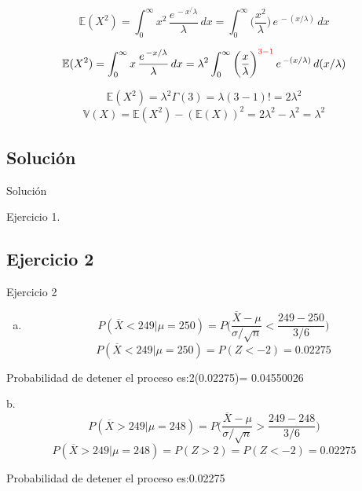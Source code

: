 \documentclass[
  ignorenonframetext,
]{beamer}
\begin{document}
\hypertarget{section}{%
\subsection{}\label{section}}

\begin{frame}{}

\[\mathbb{E}(X^2)  = \displaystyle\int_{0}^{\infty}x^2\, \frac{\displaystyle e^{\,-x^/\lambda} }{\lambda}\,dx  = \displaystyle\int_{0}^{\infty} \bigg(\frac{x^2}{\lambda}\bigg) \, \displaystyle e^{\,-(x /\lambda)} \,dx\]

\[\mathbb{E}(X^2)  = \displaystyle\int_{0}^{\infty}x\, \frac{\displaystyle e^{\,-x/\lambda} }{\lambda}\,dx =\lambda^2\displaystyle\int_{0}^{\infty} \bigg(\frac{x}{\lambda}\bigg)^{\color{red}3-1 } \, \displaystyle e^{\,-(x /\lambda)} \,d(x/\lambda)\]

\[\mathbb{E}(X^2)  =\lambda^2\Gamma(3)=\lambda(3-1)!=2\lambda^2 \]
\[\mathbb{V}(X)=\mathbb{E}(X^2)-(\mathbb{E}(X))^2 =2\lambda^2- \lambda^2=\lambda^2\]

\end{frame}

\hypertarget{soluciuxf3n}{%
\subsection{Solución}\label{soluciuxf3n}}

\begin{frame}{Solución}

Ejercicio 1.

\end{frame}

\hypertarget{ejercicio-2-1}{%
\subsection{Ejercicio 2}\label{ejercicio-2-1}}

\begin{frame}{Ejercicio 2}

\begin{enumerate}
[a.]
\item
  \justifying

  \[P(\overline{X}<249|\mu=250)=P\Bigg(\frac{\overline{X}-\mu}{\sigma/\sqrt{n}} <\frac{ 249-250}{3/6}\Bigg) \]
  \[P(\overline{X}<249|\mu=250)=P(Z<-2)=0.02275\]
\end{enumerate}

Probabilidad de detener el proceso es:2(0.02275)= 0.04550026

b.\justifying 
\[P(\overline{X}>249|\mu=248)=P\Bigg(\frac{\overline{X}-\mu}{\sigma/\sqrt{n}} >\frac{ 249-248}{3/6}\Bigg) \]
\[P(\overline{X}>249|\mu=248)=P(Z>2)=P(Z<-2)=0.02275\]

Probabilidad de detener el proceso es:0.02275

\end{frame}
\end{document}
